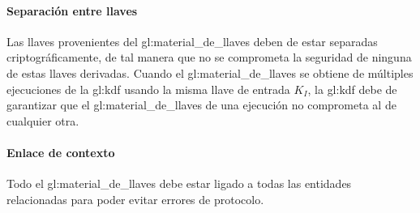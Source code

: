 \paragraph{Separación entre llaves}
Las llaves provenientes del \gls{gl:material_de_llaves} deben de estar
separadas criptográficamente, de tal manera que no se comprometa la seguridad
de ninguna de estas llaves derivadas. Cuando el \gls{gl:material_de_llaves}
se obtiene de múltiples ejecuciones de la \gls{gl:kdf} usando la misma llave
de entrada $K_I$, la \gls{gl:kdf} debe de garantizar que el
\gls{gl:material_de_llaves} de una ejecución no comprometa al de cualquier
otra.

\paragraph{Enlace de contexto}
Todo el \gls{gl:material_de_llaves} debe estar ligado a todas las entidades
relacionadas para poder evitar errores de protocolo.
